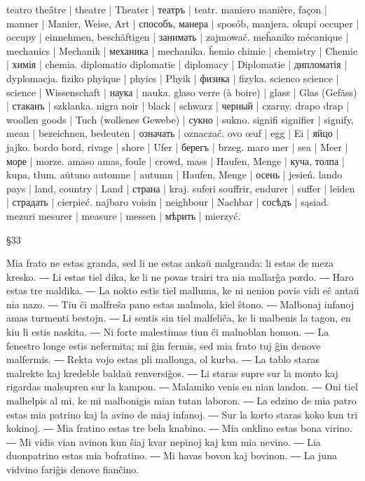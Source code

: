 teatro theâtre | theatre | Theater | театръ | teatr.
maniero manière, façon | manner | Manier, Weise, Art | способъ, манера | sposób, manjera.
okupi occuper | occupy | einnehmen, beschäftigen | занимать | zajmować.
meĥaniko mécanique | mechanics | Mechanik | механика | mechanika.
ĥemio chimie | chemistry | Chemie | химія | chemia.
diplomatio diplomatie | diplomacy | Diplomatie | дипломатія | dyplomacja.
fiziko phyique | phyics | Phyik | физика | fizyka.
scienco science | science | Wissenschaft | наука | nauka.
glaso verre (à boire) | glass | Glas (Gefäss) | стаканъ | szklanka.
nigra noir | black | schwarz | черный | czarny.
drapo drap | woollen goods | Tuch (wollenes Gewebe) | сукно | sukno.
signifi signifier | signify, mean | bezeichnen, bedeuten | означать | oznaczać.
ovo œuf | egg | Ei | яйцо | jajko.
bordo bord, rivage | shore | Ufer | берегъ | brzeg.
maro mer | sea | Meer | море | morze.
amaso amas, foule | crowd, mass | Haufen, Menge | куча, толпа | kupa, tłum.
aŭtuno automne | autumn | Haufen, Menge | осень | jesień.
lando pays | land, country | Land | страна | kraj.
suferi souffrir, endurer | suffer | leiden | страдать | cierpieć.
najbaro voisin | neighbour | Nachbar | сосѣдъ | sąsiad.
mezuri mesurer | measure | messen | мѣрить | mierzyć.

§33

Mia frato ne estas granda, sed li ne estas ankaŭ malgranda: li estas de meza kresko. ― Li estas tiel dika, ke li ne povas trairi tra nia mallarĝa pordo. ― Haro estas tre maldika. ― La nokto estis tiel malluma, ke ni nenion povis vidi eĉ antaŭ nia nazo. ― Tiu ĉi malfreŝa pano estas malmola, kiel ŝtono. ― Malbonaj infanoj amas turmenti bestojn. ― Li sentis sin tiel malfeliĉa, ke li malbenis la tagon, en kiu li estis naskita. ― Ni forte malestimas tiun ĉi malnoblan homon. ― La fenestro longe estis nefermita; mi ĝin fermis, sed mia frato tuj ĝin denove malfermis. ― Rekta vojo estas pli mallonga, ol kurba. ― La tablo staras malrekte kaj kredeble baldaŭ renversiĝos. ― Li staras supre sur la monto kaj rigardas malsupren sur la kampon. ― Malamiko venis en nian landon. ― Oni tiel malhelpis al mi, ke mi malbonigis mian tutan laboron. ― La edzino de mia patro estas mia patrino kaj la avino de miaj infanoj. ― Sur la korto staras koko kun tri kokinoj. ― Mia fratino estas tre bela knabino. ― Mia onklino estas bona virino. ― Mi vidis vian avinon kun ŝiaj kvar nepinoj kaj kun mia nevino. ― Lia duonpatrino estas mia bofratino. ― Mi havas bovon kaj bovinon. ― La juna vidvino fariĝis denove fianĉino.

